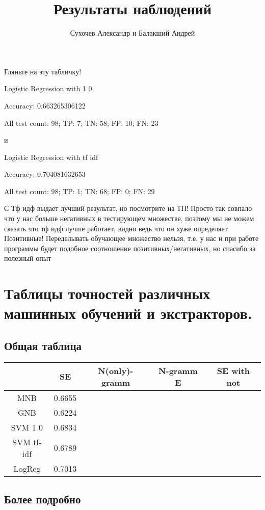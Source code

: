 \documentclass[a4paper, 12pt]{article}
\author{Сухочев Александр и Балакший Андрей}
\title{Результаты наблюдений}
\theoremstyle{plain}
\theoremstyle{definition}
\theoremstyle{remark}
\begin{document}
\maketitle

Гляньте на эту табличку!

Logistic Regression with 1 0

Accuracy: 0.663265306122

All test count: 98; TP: 7; TN: 58; FP: 10; FN: 23

и

Logistic Regression with tf idf

Accuracy: 0.704081632653

All test count: 98; TP: 1; TN: 68; FP: 0; FN: 29

С Тф идф выдает лучший результат, но посмотрите на ТП! Просто так совпало что у нас больше негативных в тестирующем множестве, поэтому мы не можем сказать что тф идф лучше работает, видно ведь что он хуже определяет Позитивные! Переделывать обучающее множество нельзя, т.е. у нас и при работе программы будет подобное соотношение позитивных/негативных, но спасибо за полезный опыт

\section{Таблицы точностей различных машинных обучений и экстракторов.}

\subsection{Общая таблица}
\begin{tabular} {|c|c|c|c|c|}
\hline
   ~~~~ & SE & N(only)-gramm & N-gramm E & SE with not \\
   \hline
  MNB & 0.6655 & & & \\
   \hline
  GNB & 0.6224 & & & \\
   \hline
  SVM 1 0 & 0.6834 & & & \\
   \hline
  SVM tf-idf & 0.6789 & & & \\
   \hline
  LogReg & 0.7013 & & & \\
\hline
\end{tabular}

\subsection{Более подробно}
\end{document}
